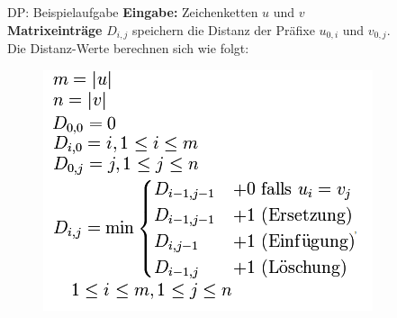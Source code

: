 \documentclass[18pt]{beamer}
\begin{document}
\begin{frame}{DP: Beispielaufgabe}
	\textbf{Eingabe:} Zeichenketten $u$ und $v$\\
  \textbf{Matrixeinträge} $D_{i,j}$ speichern die Distanz der Präfixe $u_{0,i}$ und $v_{0,j}$.\\
  Die Distanz-Werte berechnen sich wie folgt:
  \begin{figure}%
  \includegraphics[width=0.6\columnwidth]{distance.png}%
  \end{figure}
\end{frame}

\appendix
\beginbackup


\backupend
\end{document}
